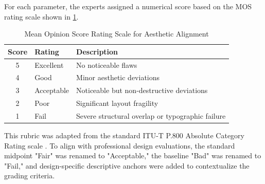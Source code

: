 \begin{refsection}
For each parameter, the experts assigned a numerical score based on the MOS rating scale shown in \ref{tab:mos-rating-scale}.
\begin{table}[ht]
\centering
\caption{Mean Opinion Score Rating Scale for Aesthetic Alignment}
\label{tab:mos-rating-scale}
\begin{tabular}{c p{} p{}}
\hline
\textbf{Score} & \textbf{Rating} & \textbf{Description} \\ \hline
5 & Excellent & No noticeable flaws \\
4 & Good & Minor aesthetic deviations \\
3 & Acceptable & Noticeable but non-destructive deviations \\
2 & Poor & Significant layout fragility \\
1 & Fail & Severe structural overlap or typographic failure \\ \hline
\end{tabular}
\end{table}
This rubric was adapted from the standard ITU-T P.800 Absolute Category Rating scale \cite{itut1996p800}. To align with professional design evaluations, the standard midpoint "Fair" was renamed to "Acceptable," the baseline "Bad" was renamed to "Fail," and design-specific descriptive anchors were added to contextualize the grading criteria.


\end{refsection}
